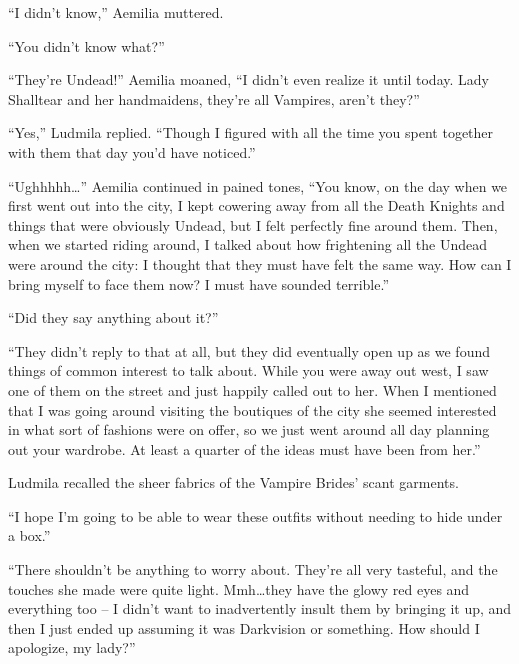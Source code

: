  

“I didn’t know,” Aemilia muttered.

 

“You didn’t know what?”

 

“They’re Undead!” Aemilia moaned, “I didn’t even realize it until today. Lady Shalltear and her handmaidens, they’re all Vampires, aren’t they?”

 

“Yes,” Ludmila replied. “Though I figured with all the time you spent together with them that day you’d have noticed.”

 

“Ughhhhh…” Aemilia continued in pained tones, “You know, on the day when we first went out into the city, I kept cowering away from all the Death Knights and things that were obviously Undead, but I felt perfectly fine around them. Then, when we started riding around, I talked about how frightening all the Undead were around the city: I thought that they must have felt the same way. How can I bring myself to face them now? I must have sounded terrible.”

 

“Did they say anything about it?”

 

“They didn’t reply to that at all, but they did eventually open up as we found things of common interest to talk about. While you were away out west, I saw one of them on the street and just happily called out to her. When I mentioned that I was going around visiting the boutiques of the city she seemed interested in what sort of fashions were on offer, so we just went around all day planning out your wardrobe. At least a quarter of the ideas must have been from her.”

 

Ludmila recalled the sheer fabrics of the Vampire Brides’ scant garments.

 

“I hope I’m going to be able to wear these outfits without needing to hide under a box.”

 

“There shouldn’t be anything to worry about. They’re all very tasteful, and the touches she made were quite light. Mmh…they have the glowy red eyes and everything too – I didn’t want to inadvertently insult them by bringing it up, and then I just ended up assuming it was Darkvision or something. How should I apologize, my lady?”

